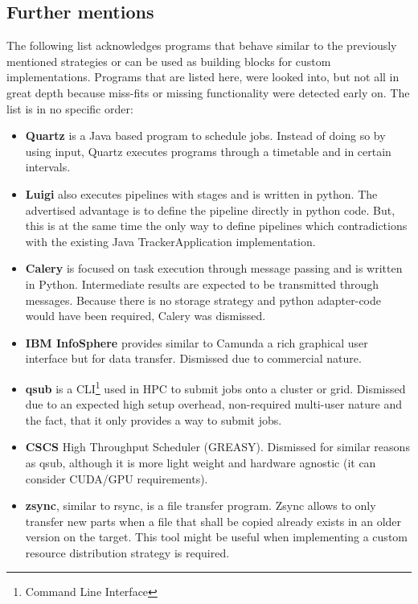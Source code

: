 \subsection{Further mentions}

The following list acknowledges programs that behave similar to the previously mentioned strategies or can be used as building blocks for custom implementations.
Programs that are listed here, were looked into, but not all in great depth because miss-fits or missing functionality were detected early on.
The list is in no specific order:

\begin{itemize}
	\item \textbf{Quartz}\cite{quartz:main} is a Java based program to schedule jobs. Instead of doing so by using input, Quartz executes programs through a timetable and in certain intervals.
	\item \textbf{Luigi}\cite{luigi:etc:distributed_pipelines} also executes pipelines with stages and is written in python. The advertised advantage is to define the pipeline directly in python code. But, this is at the same time the only way to define pipelines which contradictions with the existing Java TrackerApplication implementation.
	\item \textbf{Calery}\cite{celery:main} is focused on task execution through message passing and is written in Python. Intermediate results are expected to be transmitted through messages. Because there is no storage strategy and python adapter-code would have been required, Calery was dismissed.
	\item \textbf{IBM InfoSphere}\cite{infosphere:datastage} provides similar to Camunda a rich graphical user interface but for data transfer. Dismissed due to commercial nature.
	\item \textbf{qsub}\cite{qsub:etc:wiki}\cite{qsub:etc:uiowa} is a CLI\footnote{Command Line Interface} used in HPC to submit jobs onto a cluster or grid. Dismissed due to an expected high setup overhead, non-required multi-user nature and the fact, that it only provides a way to submit jobs.
	\item \textbf{CSCS}\cite{cscs:high_throughput} High Throughput Scheduler (GREASY). Dismissed for similar reasons as qsub, although it is more light weight and hardware agnostic (it can consider CUDA/GPU requirements).
	\item \textbf{zsync}\cite{zsync:main}, similar to rsync, is a file transfer program. Zsync allows to only transfer new parts when a file that shall be copied already exists in an older version on the target. This tool might be useful when implementing a custom resource distribution strategy is required.

\end{itemize}
